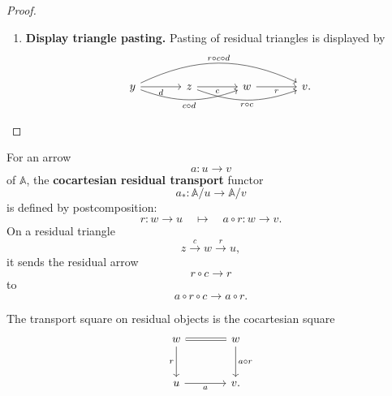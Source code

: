 \begin{proof}
\begin{enumerate}
        \item \textbf{Display triangle pasting.} Pasting of residual triangles is displayed by
        \[
            \begin{tikzcd}[column sep=large, row sep=large]
                    y
                        \arrow[r, "d"']
                        \arrow[rr, "c\circ d", swap, bend right=20]
                        \arrow[rrr, "r\circ c\circ d", bend left=25]
                &
                    z
                        \arrow[r, "c"']
                        \arrow[rr, "r\circ c", swap, bend right=20]
                &
                    w
                        \arrow[r, "r"']
                &
                    v.
            \end{tikzcd}
        \]
    \end{enumerate}
\end{proof}

\begin{definition}
\label{def:residual-transport}
    For an arrow
    \[
        a:u\to v
    \]
    of \(\mathbb A\), the \textbf{cocartesian residual transport} functor
    \[
        a_*:\mathbb A/u\to\mathbb A/v
    \]
    is defined by postcomposition:
    \[
        r:w\to u
        \quad\longmapsto\quad
        a\circ r:w\to v.
    \]
    On a residual triangle
    \[
        z\xrightarrow{c}w\xrightarrow{r}u,
    \]
    it sends the residual arrow
    \[
        r\circ c\to r
    \]
    to
    \[
        a\circ r\circ c\to a\circ r.
    \]
\end{definition}

The transport square on residual objects is the cocartesian square
\[
    \begin{tikzcd}[column sep=large, row sep=large]
            w
                \arrow[r, equal]
                \arrow[d, "r"']
        &
            w
                \arrow[d, "a\circ r"]
        \\
            u
                \arrow[r, "a"']
        &
            v.
    \end{tikzcd}
\]

